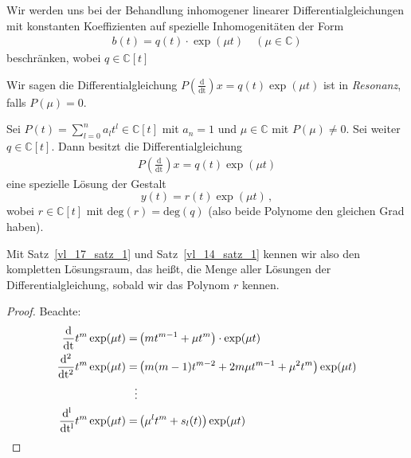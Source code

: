 	Wir werden uns bei der Behandlung inhomogener linearer Differentialgleichungen 
	mit konstanten Koeffizienten auf spezielle Inhomogenitäten der Form
	\begin{align*}
		b(t) = q(t) \cdot \exp(\mu t) \quad (\mu \in \mathbb{C})
	\end{align*}
	beschränken, wobei $q \in \mathbb{C} [t]$
\begin{Definition}{
	Wir sagen die Differentialgleichung $P\left( \frac{\mathrm{d}}
	{\mathrm{dt}}\right)x = q(t) \exp(\mu t)$ ist in \emph{Resonanz}, falls 
	$P(\mu) = 0$.
}\end{Definition}

\begin{Satz}{\label{vl_17_satz_1}
	Sei $P(t) = \sum_{l=0}^n a_l t^l \in \mathbb{C}[t]$ mit 
	$a_n = 1$ und $\mu \in \mathbb{C}$ mit $P(\mu) \neq 0$. Sei weiter 
	$q \in \mathbb{C}[t]$. Dann besitzt die Differentialgleichung 
	\begin{align*}
		P\left(\frac{\mathrm{d}}{\mathrm{dt}}\right) x = q(t) \exp(\mu t)
	\end{align*}
	eine spezielle Lösung der Gestalt
	$$y(t) = r(t) \exp(\mu t)\,,$$
	wobei  $r \in \mathbb{C}[t]$ mit $\mathrm{deg} (r) = \mathrm{deg}(q)$ (also beide Polynome den gleichen Grad haben).
}\end{Satz}

\begin{Bemerkung}{
	Mit Satz~\ref{vl_17_satz_1}  und Satz~\ref{vl_14_satz_1}  kennen wir also den kompletten 
	Lösungsraum, das heißt, die Menge aller Lösungen der Differentialgleichung,
	sobald wir das Polynom $r$ kennen.
}\end{Bemerkung}
\begin{proof}
	Beachte: 
	\begin{align}
		\frac{\mathrm{d}}{\mathrm{dt}} t^m \exp ( \mu t) = 
			& \left( m t^{m-1} + \mu t^m \right) \cdot \exp(\mu t) \notag \\
		 \frac{\mathrm{d^2}}{\mathrm{dt^2}} 
		 t^m \exp ( \mu t) = & \left( m (m-1) t^{m-2} + 
			 2m \mu t^{m-1} + {\mu}^2 t^m \right) \exp(\mu t) \notag \\
		 \vdots \notag
		 \\
		 \frac{\mathrm{d^l}}{\mathrm{dt^l}} t^m \exp(\mu t) 
		 	= & \left( {\mu}^l t^m + s_l(t) \right)\exp(\mu t)  \label{vl_17_gl_1}
	\end{align}
\end{proof}

